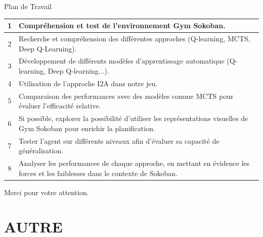 \documentclass[
	11pt, %
]{beamer}
\begin{document}
\begin{frame}{Plan de Travail}
    \begin{table}
        \centering
		\small
        \begin{tabular}{|c|p{8cm}|}
            \hline
            1 & Compréhension et test de l'environnement Gym Sokoban. \\
            \hline
            2 & Recherche et compréhension des différentes approches (Q-learning, MCTS, Deep Q-Learning). \\
            \hline
            3 & Développement de différents modèles d'apprentissage automatique (Q-learning, Deep Q-learning...). \\
            \hline
            4 & Utilisation de l'approche I2A dans notre jeu. \\
            \hline
            5 & Comparaison des performances avec des modèles comme MCTS pour évaluer l'efficacité relative. \\
            \hline
            6 & Si possible, explorer la possibilité d'utiliser les représentations visuelles de Gym Sokoban pour enrichir la planification. \\
            \hline
            7 & Tester l'agent sur différents niveaux afin d'évaluer sa capacité de généralisation. \\
            \hline
            8 & Analyser les performances de chaque approche, en mettant en évidence les forces et les faiblesses dans le contexte de Sokoban. \\
            \hline
        \end{tabular}
    \end{table}
\end{frame}


\begin{frame}[plain] %
	\begin{center}
		{\Huge Merci pour votre attention.}
		
	\end{center}
\end{frame}
\section{AUTRE}

\end{document}
